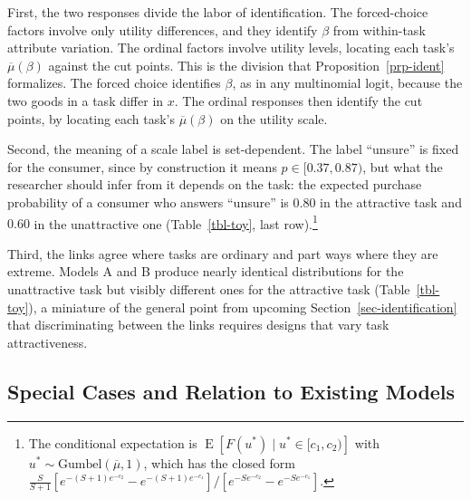 \documentclass[
  letterpaper,
  DIV=11,
  numbers=noendperiod]{scrartcl}
\theoremstyle{plain}
\theoremstyle{plain}
\theoremstyle{remark}
\begin{document}
First, the two responses divide the labor of identification. The
forced-choice factors involve only utility differences, and they
identify \(\beta\) from within-task attribute variation. The ordinal
factors involve utility levels, locating each task's
\(\overline{\mu}(\beta)\) against the cut points. This is the division
that Proposition~\ref{prp-ident} formalizes. The forced choice
identifies \(\beta\), as in any multinomial logit, because the two goods
in a task differ in \(x\). The ordinal responses then identify the cut
points, by locating each task's \(\overline{\mu}(\beta)\) on the utility
scale.

Second, the meaning of a scale label is set-dependent. The label
``unsure'' is fixed for the consumer, since by construction it means
\(p \in [0.37, 0.87)\), but what the researcher should infer from it
depends on the task: the expected purchase probability of a consumer who
answers ``unsure'' is \(0.80\) in the attractive task and \(0.60\) in
the unattractive one (Table~\ref{tbl-toy}, last row).\footnote{The
  conditional expectation is
  \(\operatorname{E} \left[ F(u^*) \mid u^* \in [c_1, c_2) \right]\)
  with \(u^* \sim \text{Gumbel}(\overline{\mu}, 1)\), which has the
  closed form
  \(\frac{S}{S+1} \left[ e^{-(S+1)e^{-c_2}} - e^{-(S+1)e^{-c_1}} \right] \big/ \left[ e^{-S e^{-c_2}} - e^{-S e^{-c_1}} \right]\).}

Third, the links agree where tasks are ordinary and part ways where they
are extreme. Models A and B produce nearly identical distributions for
the unattractive task but visibly different ones for the attractive task
(Table~\ref{tbl-toy}), a miniature of the general point from upcoming
Section~\ref{sec-identification} that discriminating between the links
requires designs that vary task attractiveness.

\subsection{Special Cases and Relation to Existing
Models}\label{sec-nesting}
\end{document}
